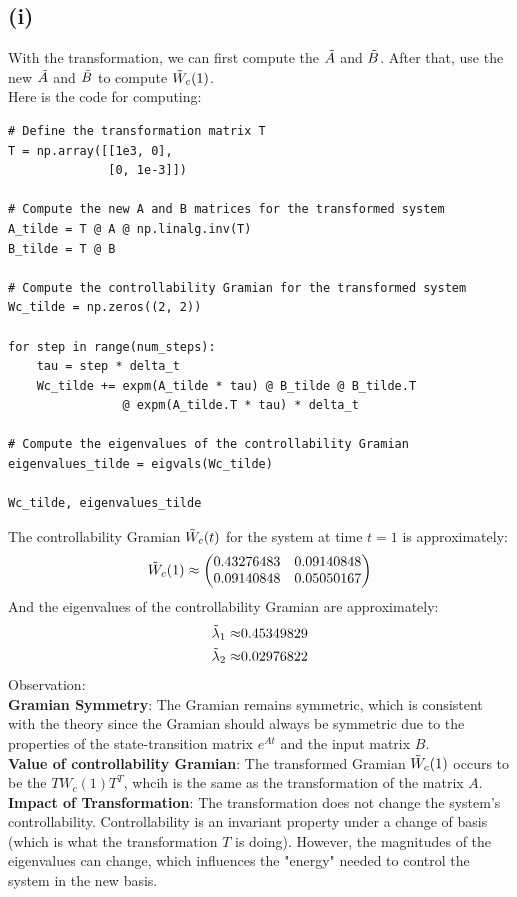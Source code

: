 \documentclass[12pt]{article}
\begin{document}
\subsection*{(i)}
With the transformation, we can first compute the $\Tilde{A}$ and $\Tilde{B}$. After that, use the new $\Tilde{A}$ and $\Tilde{B}$ to compute $\Tilde{W}_c(1)$.\\
Here is the code for computing:
\begin{verbatim}
# Define the transformation matrix T
T = np.array([[1e3, 0],
              [0, 1e-3]])

# Compute the new A and B matrices for the transformed system
A_tilde = T @ A @ np.linalg.inv(T)
B_tilde = T @ B

# Compute the controllability Gramian for the transformed system
Wc_tilde = np.zeros((2, 2))

for step in range(num_steps):
    tau = step * delta_t
    Wc_tilde += expm(A_tilde * tau) @ B_tilde @ B_tilde.T 
                @ expm(A_tilde.T * tau) * delta_t

# Compute the eigenvalues of the controllability Gramian
eigenvalues_tilde = eigvals(Wc_tilde)

Wc_tilde, eigenvalues_tilde
\end{verbatim}
The controllability Gramian $\Tilde{W}_c(t)$ for the system at time $t=1$ is approximately:
\[
\Tilde{W}_c(1) \approx \begin{pmatrix}
0.43276483 & 0.09140848 \\
0.09140848 & 0.05050167
\end{pmatrix}
\]
And the eigenvalues of the controllability Gramian are approximately:
\[
\begin{split}
\Tilde{\lambda}_1 \approx& 0.45349829 \\
\Tilde{\lambda}_2 \approx& 0.02976822  
\end{split}
\]
Observation:\\
\textbf{Gramian Symmetry}: The Gramian remains symmetric, which is consistent with the theory since the Gramian should always be symmetric due to the properties of the state-transition matrix $e^{At}$ and the input matrix $B$.\\

\textbf{Value of controllability Gramian}: The transformed Gramian $\Tilde{W}_c(1)$ occurs to be the $TW_c(1)T^T$, whcih is the same as the transformation of the matrix $A$.\\

\textbf{Impact of Transformation}: The transformation does not change the system's controllability. Controllability is an invariant property under a change of basis (which is what the transformation $T$ is doing). However, the magnitudes of the eigenvalues can change, which influences the "energy" needed to control the system in the new basis.\\
\end{document}
